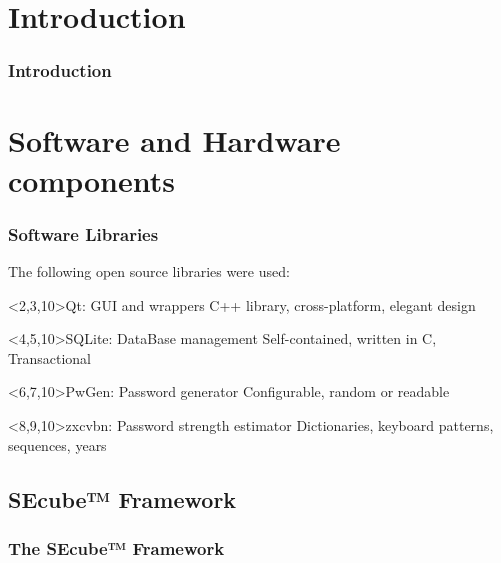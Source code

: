 \documentclass[14pt,usenames,dvipsnames]{beamer}
\begin{document}
\section{Introduction}



\begin{frame}
\frametitle{Introduction}


\end{frame}



\section{Software and Hardware components}

\begin{frame}
\frametitle{Software Libraries}

The following open source libraries were used:

\begin{block}<2,3,10>{Qt: GUI and wrappers}
 {C++ library, cross-platform, elegant design}
\end{block}

\begin{block}<4,5,10>{SQLite: DataBase management}
 {Self-contained, written in C, Transactional}
\end{block}

\begin{block}<6,7,10>{PwGen: Password generator}
 {Configurable, random or readable}
\end{block}

\begin{block}<8,9,10>{zxcvbn: Password strength estimator}
 {Dictionaries, keyboard patterns, sequences, years}
\end{block}
\end{frame}


\subsection{SEcube™ Framework}

\begin{frame}
\frametitle{The SEcube™ Framework}



\end{frame}
\end{document}
